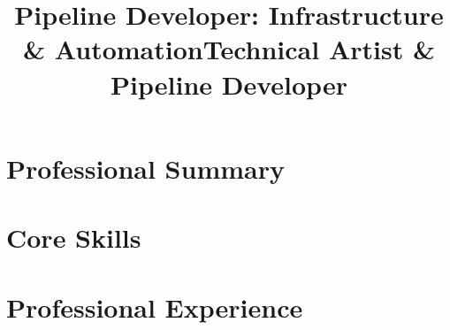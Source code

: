 \documentclass[10pt,a4paper,sans]{moderncv}
\title{Pipeline Developer: Infrastructure \& Automation}
\title{Technical Artist \& Pipeline Developer}
\newif\ifIT
\newif\ifTechArt
\begin{document}
\makecvtitle

\section{Professional Summary}
\ifIT
	\cvitem{}{Pipeline and infrastructure developer for an architectural visualization studio: Python automation, render-farm deployment, and Windows administration. Focused on reliable, unattended automation: silent software deployment, scheduled-task orchestration, and git-based release workflows, alongside Microsoft 365/Azure administration. Background in technical art; shipped SMITE 2 at Hi-Rez Studios.}
\fi
\ifTechArt
	\cvitem{}{Technical artist and pipeline developer who shipped \textbf{SMITE 2} at Hi-Rez Studios: character rigging plus the Python/MaxScript tooling behind the asset pipeline, with contract technical-art work in Unreal Engine 5. Now building production infrastructure for an architectural visualization studio (PyQt desktop tooling, render-farm automation, cross-DCC workflows), so tools stay grounded in how artists actually think and work.}
\fi

\section{Core Skills}
\ifIT
	\cvitem{Infrastructure}{Windows \& Linux administration; Microsoft 365 \& Azure; user/device management; remote access}
	\cvitem{Automation}{Python, Bash, PowerShell; silent software deployment; scheduled-task orchestration; batch processing}
	\cvitem{Render Farm}{Deployment and submission automation for 3ds Max render farms}
	\cvitem{Tools}{Git, Perforce, Jira, Confluence, PyQt}
\fi

\ifTechArt
	\cvitem{Programming}{Python (PyQt, pymxs, Maya API), MaxScript, MEL, Bash, Git, Perforce}
	\cvitem{DCC/Engines}{3ds Max, Maya, Unreal Engine 5, Unity, Substance Painter}
	\cvitem{Focus}{Character rigging, pipeline development, render-farm automation, batch tooling}
\fi

\section{Professional Experience}
\end{document}
